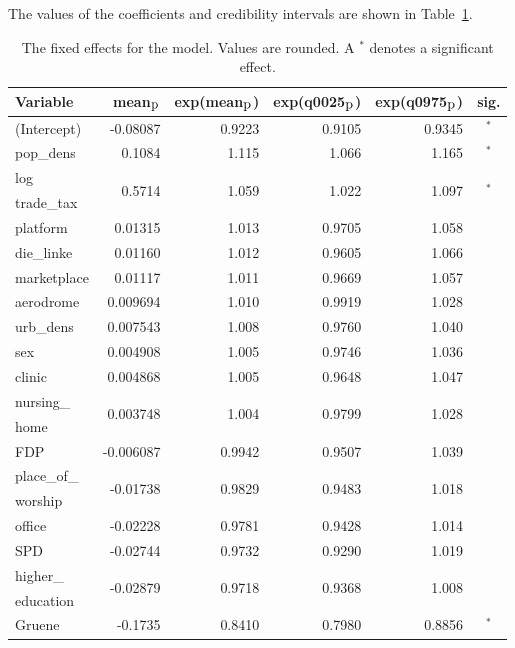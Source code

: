%     
The values of the coefficients and credibility intervals are shown in Table~\ref{FixedAllGermany_spatial}.
\begin{table}[H]
\caption{The fixed effects for the model. Values are rounded. A $^*$ denotes a significant effect. \label{FixedAllGermany_spatial}}
\begin{tabular}{l r r r r c}
\toprule
\textbf{Variable}	& \textbf{mean$_{\hbox{p}}$}	& \textbf{exp(mean$_{\hbox{p}}$)} & \textbf{exp(q0025$_{\hbox{p}}$)} & \textbf{exp(q0975$_{\hbox{p}}$)} & \textbf{sig.}\\
\midrule
(Intercept) & -0.08087 & 0.9223 & 0.9105 & 0.9345 & $^*$\\
pop\_dens & 0.1084 & 1.115 & 1.066 & 1.165 & $^*$\\
log & \multirow{2}{*}{0.5714} & \multirow{2}{*}{1.059} & \multirow{2}{*}{1.022} & \multirow{2}{*}{1.097} & \multirow{2}{*}{$^*$}\\
trade\_tax \\
platform & 0.01315 & 1.013 & 0.9705 & 1.058 \\
die\_linke & 0.01160 & 1.012 & 0.9605 & 1.066 \\
marketplace & 0.01117 & 1.011 & 0.9669 & 1.057 \\
aerodrome & 0.009694 & 1.010 & 0.9919 & 1.028 \\
urb\_dens & 0.007543 & 1.008 & 0.9760 & 1.040 \\
sex & 0.004908 & 1.005 & 0.9746 & 1.036 \\
clinic & 0.004868 & 1.005 & 0.9648 & 1.047 \\
nursing\_ & \multirow{2}{*}{0.003748} & \multirow{2}{*}{1.004} & \multirow{2}{*}{0.9799} & \multirow{2}{*}{1.028} \\
home\\
FDP & -0.006087 & 0.9942 & 0.9507 & 1.039 \\
place\_of\_ & \multirow{2}{*}{-0.01738} & \multirow{2}{*}{0.9829} & \multirow{2}{*}{0.9483} & \multirow{2}{*}{1.018} \\
worship\\
office & -0.02228 & 0.9781 & 0.9428 & 1.014 \\
SPD & -0.02744 & 0.9732 & 0.9290 & 1.019 \\
higher\_ & \multirow{2}{*}{-0.02879} & \multirow{2}{*}{0.9718} & \multirow{2}{*}{0.9368} & \multirow{2}{*}{1.008} \\
education\\
Gruene & -0.1735 & 0.8410 & 0.7980 & 0.8856 & $^*$\\
\bottomrule
\end{tabular}
\end{table}
